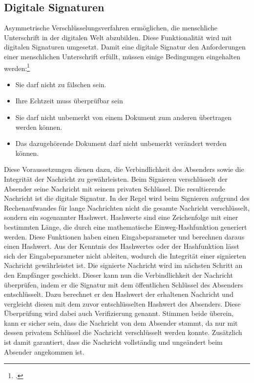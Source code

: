 \documentclass  [paper=a4,
				fontsize=12pt,
				listof=totoc,
				bibliography=totoc
				]{scrreprt}
\begin{document}
			\subsection{Digitale Signaturen}\label{chp: Signatur}	
				Asymmetrische Verschlüsselungsverfahren ermöglichen, die menschliche Unterschrift in der digitalen Welt abzubilden. Diese Funktionalität wird mit digitalen Signaturen umgesetzt. Damit eine digitale Signatur den Anforderungen einer menschlichen Unterschrift erfüllt, müssen einige Bedingungen eingehalten werden:\footcite[S. 202]{Schmeh2013}
				\begin{itemize}
					\item Sie darf nicht zu fälschen sein.
					\item Ihre Echtzeit muss überprüfbar sein
					\item Sie darf nicht unbemerkt von einem Dokument zum anderen übertragen werden können.
					\item Das dazugehörende Dokument darf nicht unbemerkt verändert werden können.
				\end{itemize}
				Diese Voraussetzungen dienen dazu, die Verbindlichkeit des Absenders sowie die Integrität der Nachricht zu gewährleisten. Beim Signieren verschlüsselt der Absender seine Nachricht mit seinem privaten Schlüssel. Die resultierende Nachricht ist die digitale Signatur. In der Regel wird
				beim Signieren aufgrund des Rechenaufwandes für lange Nachrichten nicht die gesamte Nachricht verschlüsselt, sondern ein sogenannter Hashwert. Hashwerte sind eine Zeichenfolge mit einer bestimmten Länge, die durch eine mathematische Einweg-Hashfunktion generiert werden. Diese Funktionen haben einen Eingabeparameter und berechnen daraus einen Hashwert. Aus der Kenntnis des Hashwertes oder der Hashfunktion lässt sich der Eingabeparameter nicht ableiten, wodurch die Integrität einer signierten Nachricht gewährleistet ist.
				Die signierte Nachricht wird im nächsten Schritt an den Empfänger geschickt. Dieser kann nun die Verbindlichkeit der Nachricht überprüfen, indem er die Signatur mit dem öffentlichen Schlüssel des Absenders entschlüsselt. Dazu berechnet er den Hashwert der erhaltenen Nachricht und vergleicht diesen mit dem zuvor entschlüsselten Hashwert des Absenders. Diese Überprüfung wird dabei auch Verifizierung genannt. Stimmen beide überein, kann er sicher sein, dass die Nachricht von dem Absender stammt, da nur mit dessen privatem Schlüssel die Nachricht verschlüsselt werden konnte. Zusätzlich ist damit garantiert, dass die Nachricht vollständig und ungeändert beim Absender angekommen ist.
				
\end{document}
